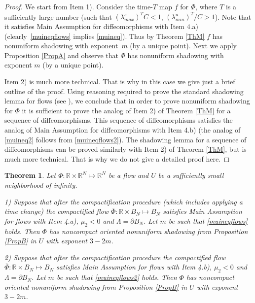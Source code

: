 \documentclass[11pt]{article}
\newcounter{razdel}[section]
\theoremstyle{Mystyle}
\newtheorem{Theorem}[razdel]{Theorem}
\begin{document}
\begin{proof}
We start from Item 1). Consider the time-$T$ map $f$ for $\Phi$, where $T$ is a sufficiently large number (such that $(\lambda^{s}_{max})^{T}C<1$, $(\lambda^{u}_{min})^{T}/C>1$). Note that it satisfies Main Assumption for diffeomorphisms with Item 4.a) (clearly~\eqref{muineqflows} implies \eqref{muineq}). Thus by Theorem \ref{ThM} $f$ has nonuniform shadowing with exponent~$m$ (by a unique point). Next we apply Proposition \ref{PropA} and observe that $\Phi$ has nonuniform shadowing with exponent $m$
(by a unique point).

Item 2) is much more technical. That is why in this case we give just a brief outline of the proof. Using reasoning required to prove the standard shadowing lemma for flows (see \cite{Pil}), we conclude that in order to prove nonuniform shadowing for $\Phi$ it is sufficient to prove the analog of Item 2) of Theorem \ref{ThM} for a sequence of diffeomorphisms. This sequence of diffeomorphisms satisfies the analog of Main Assumption for diffeomorphisms with Item 4.b) (the analog of \eqref{muineq2} follows from \eqref{muineqflows2}). The shadowing lemma for a sequence of diffeomorphisms can be proved similarly with Item 2) of Theorem \ref{ThM}, but is much more technical. That is why we do not give a detailed proof here.
\end{proof}

\begin{Theorem}
\label{Th3}
Let $\Phi:\mathbb{R}\times \mathbb{R}^{N}\mapsto \mathbb{R}^{N}$ be a flow and $U$ be a sufficiently small neighborhood of infinity. %

1) Suppose that after the compactification procedure (which includes applying a time change) the compactified flow $\bar{\Phi}:\mathbb{R}\times B_{N}\mapsto B_{N}$ satisfies Main Assumption for flows with Item 4.a), $\mu_2<0$ and $\Lambda = \partial B_N$. Let $m$ be such that \eqref{muineqflows} holds. Then $\Phi$ has noncompact oriented nonuniform shadowing from Proposition \ref{PropB} in $U$ with exponent $3-2m$.

2) Suppose that after the compactification procedure the compactified flow $\bar{\Phi}:\mathbb{R}\times B_{N}\mapsto B_{N}$ satisfies Main Assumption for flows with Item 4.b), $\mu_2<0$ and $\Lambda = \partial B_N$. Let $m$ be such that \eqref{muineqflows2} holds. Then $\Phi$ has noncompact oriented nonuniform shadowing from Proposition \ref{PropB} in $U$ with exponent $3-2m$.
\end{Theorem}
\end{document}
